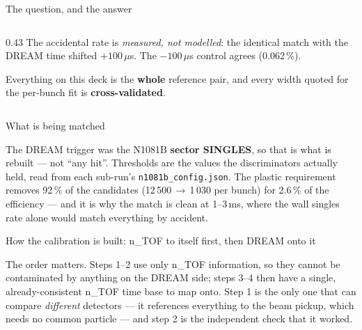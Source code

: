 \documentclass[aspectratio=169,10pt]{beamer}
\newcommand{\ntof}{n\_TOF}
\begin{document}
\begin{frame}{The question, and the answer}
\begin{columns}[T]
\begin{column}{0.43\textwidth}
\footnotesize
The accidental rate is \emph{measured, not modelled}: the identical match with
the DREAM time shifted $+100\,\mu$s. The $-100\,\mu$s control agrees
(0.062\,\%).
\vspace{0.4em}

Everything on this deck is the \textbf{whole} reference pair, and every width
quoted for the per-bunch fit is \textbf{cross-validated}.
\end{column}
\end{columns}
\end{frame}

\begin{frame}{What is being matched}
\begin{center}
\resizebox{!}{0.63\textheight}{\matchflowdiagram}
\end{center}
\vspace{-0.3em}
\footnotesize
The DREAM trigger was the N1081B \textbf{sector SINGLES}, so that is what is
rebuilt --- not ``any hit''. Thresholds are the values the discriminators
actually held, read from each sub-run's \texttt{n1081b\_config.json}.
The plastic requirement removes 92\,\% of the candidates
(12\,500\,$\to$\,1\,030 per bunch) for 2.6\,\% of the efficiency --- and it is
why the match is clean at 1--3\,ms, where the wall singles rate alone would
match everything by accident.
\end{frame}

\begin{frame}{How the calibration is built: \ntof{} to itself first, then DREAM onto it}
\begin{center}
\resizebox{0.98\textwidth}{!}{\calibchaindiagram}
\end{center}
\vspace{0.2em}
\footnotesize
The order matters. Steps 1--2 use only \ntof{} information, so they cannot be
contaminated by anything on the DREAM side; steps 3--4 then have a single,
already-consistent \ntof{} time base to map onto. Step 1 is the only one that
can compare \emph{different} detectors --- it references everything to the beam
pickup, which needs no common particle --- and step 2 is the independent check
that it worked.
\end{frame}
\end{document}
